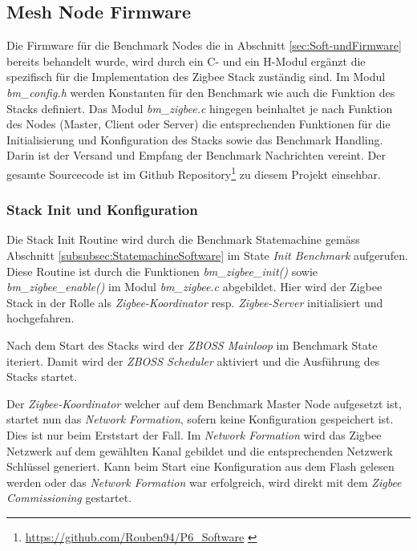 \subsection{Mesh Node Firmware}\label{subsec:ZigbeeMeshNodeFirmware}
Die Firmware für die Benchmark Nodes die in Abschnitt \ref{sec:Soft-undFirmware} bereits behandelt wurde, wird durch ein C- und ein H-Modul ergänzt die spezifisch für die Implementation des Zigbee Stack zuständig sind.
Im Modul \textit{bm\_config.h} werden Konstanten für den Benchmark wie auch die Funktion des Stacks definiert.
Das Modul \textit{bm\_zigbee.c} hingegen beinhaltet je nach Funktion des Nodes (Master, Client oder Server) die entsprechenden Funktionen für die Initialisierung und Konfiguration des Stacks sowie das Benchmark Handling.
Darin ist der Versand und Empfang der Benchmark Nachrichten vereint.
Der gesamte Sourcecode ist im Github Repository\footnote{\url{https://github.com/Rouben94/P6_Software} \cite{anklin_bobst_horath_rouben94p6_software_nodate}} zu diesem Projekt einsehbar.

\subsubsection{Stack Init und Konfiguration}\label{subsubsec:ZigbeeStackInitundKonfiguration}
Die Stack Init Routine wird durch die Benchmark Statemachine gemäss Abschnitt \ref{subsubsec:StatemachineSoftware} im State \textit{Init Benchmark} aufgerufen.
Diese Routine ist durch die Funktionen \textit{bm\_zigbee\_init()} sowie \textit{bm\_zigbee\_enable()} im Modul \textit{bm\_zigbee.c} abgebildet.
Hier wird der Zigbee Stack in der Rolle als \textit{Zigbee-Koordinator} resp. \textit{Zigbee-Server} initialisiert und hochgefahren.

Nach dem Start des Stacks wird der \textit{ZBOSS Mainloop} im Benchmark State iteriert. Damit wird der \textit{ZBOSS Scheduler} aktiviert und die Ausführung des Stacks startet.

Der \textit{Zigbee-Koordinator} welcher auf dem Benchmark Master Node aufgesetzt ist, startet nun das \textit{Network Formation}, sofern keine Konfiguration gespeichert ist.
Dies ist nur beim Erststart der Fall.
Im \textit{Network Formation} wird das Zigbee Netzwerk auf dem gewählten Kanal gebildet und die entsprechenden Netzwerk Schlüssel generiert.
Kann beim Start eine Konfiguration aus dem Flash gelesen werden oder das \textit{Network Formation} war erfolgreich, wird direkt mit dem \textit{Zigbee Commissioning} gestartet.

